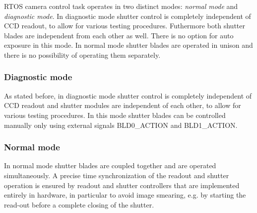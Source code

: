 RTOS camera control task operates in two distinct modes: \emph{normal mode} and \emph{diagnostic mode}. In diagnostic mode shutter control is completely independent of CCD readout, to allow for various testing procedures. Futhermore both shutter blades are independent from each other as well. There is no option for auto exposure in this mode. In normal mode shutter blades are operated in unison and there is no possibility of operating them separately.

\subsubsection{Diagnostic mode}
As stated before, in diagnostic mode shutter control is completely independent of CCD readout and shutter modules are independent of each other, to allow for various testing procedures. In this mode shutter blades can be controlled manually only using external signals BLD0\_ACTION and BLD1\_ACTION.
\subsubsection{Normal mode}

In normal mode shutter blades are coupled together and are operated simultaneously. A precise time synchronization of the readout and shutter operation is ensured by readout and shutter controllers that are implemented entirely in hardware, in particular to avoid image smearing, e.g. by starting the read-out before a complete closing of the shutter.

